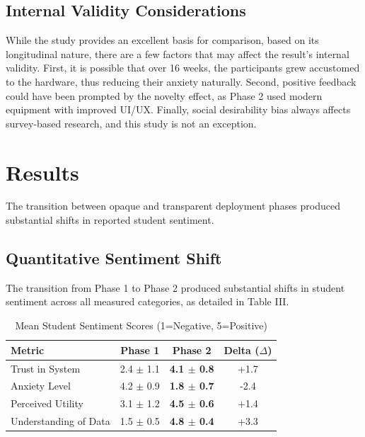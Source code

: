 \documentclass[conference]{IEEEtran}
\begin{document}
\subsection{Internal Validity Considerations}
While the study provides an excellent basis for comparison, based on its longitudinal nature, there are a few factors that may affect the result’s internal validity. First, it is possible that over 16 weeks, the participants grew accustomed to the hardware, thus reducing their anxiety naturally. Second, positive feedback could have been prompted by the novelty effect, as Phase 2 used modern equipment with improved UI/UX. Finally, social desirability bias always affects survey-based research, and this study is not an exception.

\section{Results}

The transition between opaque and transparent deployment phases produced substantial shifts in reported student sentiment.

\subsection{Quantitative Sentiment Shift}
The transition from Phase 1 to Phase 2 produced substantial shifts in student sentiment across all measured categories, as detailed in Table III.

\begin{table}[htbp]
\caption{Mean Student Sentiment Scores (1=Negative, 5=Positive)}
\begin{center}
\begin{tabular}{lccc}
\toprule
\textbf{Metric} & \textbf{Phase 1} & \textbf{Phase 2} & \textbf{Delta ($\Delta$)} \\
\midrule
Trust in System & 2.4 $\pm$ 1.1 & \textbf{4.1 $\pm$ 0.8} & +1.7 \\
Anxiety Level & 4.2 $\pm$ 0.9 & \textbf{1.8 $\pm$ 0.7} & -2.4 \\
Perceived Utility & 3.1 $\pm$ 1.2 & \textbf{4.5 $\pm$ 0.6} & +1.4 \\
Understanding of Data & 1.5 $\pm$ 0.5 & \textbf{4.8 $\pm$ 0.4} & +3.3 \\
\bottomrule
\end{tabular}
\end{center}
\label{tab:results}
\end{table}
\end{document}
